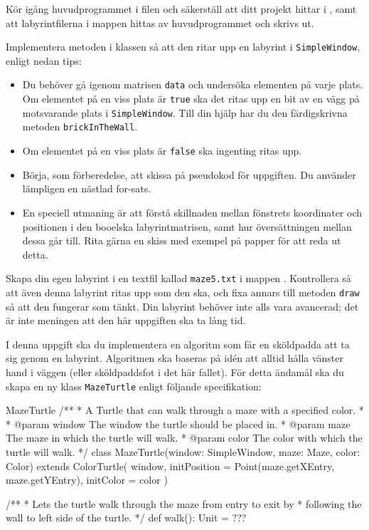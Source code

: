 \Task Kör igång huvudprogrammet i filen  och säkerställ att ditt projekt hittar  i , samt att labyrintfilerna i mappen  hittas av huvudprogrammet och skrivs ut.

\Task Implementera metoden  i klassen  så att den ritar upp en labyrint i \texttt{SimpleWindow}, enligt nedan tips:

\begin{itemize}
\item Du behöver gå igenom matrisen \texttt{data} och undersöka elementen på varje plats. Om elementet på en viss plats är \texttt{true} ska det ritas upp en bit av en vägg på motsvarande plats i \texttt{SimpleWindow}. 
Till din hjälp har du den färdigskrivna metoden \texttt{brickInTheWall}. 

\item Om elementet på en viss plats är \texttt{false} ska ingenting ritas upp.

\item Börja, som förberedelse, att skissa på pseudokod för uppgiften. Du använder lämpligen en nästlad for-sats.

\item En speciell utmaning är att förstå skillnaden mellan fönstrets koordinater och positionen i den booelska labyrintmatrisen, samt hur översättningen mellan dessa går till. Rita gärna en skiss med exempel på papper för att reda ut detta.
\end{itemize} 


\Task Skapa din egen labyrint i en textfil kallad \texttt{maze5.txt} i mappen . Kontrollera så att även denna labyrint ritas upp som den ska, och fixa annars till metoden \texttt{draw} så att den fungerar som tänkt. Din labyrint behöver inte alls vara avancerad; det är inte meningen att den här uppgiften ska ta lång tid.


\Task I denna uppgift ska du implementera en algoritm som får en sköldpadda att ta sig genom en labyrint. Algoritmen ska baseras på idén att alltid hålla vänster hand i väggen (eller sköldpaddsfot i det här fallet). För detta ändamål ska du skapa en ny klass \texttt{MazeTurtle} enligt följande specifikation:

\begin{ScalaSpec}{MazeTurtle}
/**
  * A Turtle that can walk through a maze with a specified color.
  *
  * @param window The window the turtle should be placed in.
  * @param maze   The maze in which the turtle will walk.
  * @param color  The color with which the turtle will walk.
  */
class MazeTurtle(window: SimpleWindow,
                 maze: Maze,
                 color: Color)
  extends ColorTurtle(
    window,
    initPosition = Point(maze.getXEntry, maze.getYEntry),
    initColor = color
  ) {

  /**
    * Lets the turtle walk through the maze from entry to exit by 
    * following the wall to left side of the turtle.
    */
  def walk(): Unit = ???

}

\end{ScalaSpec}

